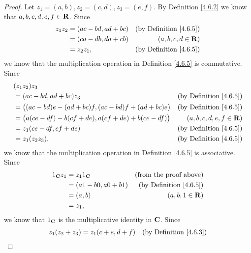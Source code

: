 \begin{proof}
    Let \(z_1 = (a, b), z_2 = (c, d), z_3 = (e, f)\).
    By Definition \ref{4.6.2} we know that \(a, b, c, d, e, f \in \mathbf{R}\).
    Since
    \begin{align*}
        z_1 z_2 & = (ac - bd, ad + bc) & \text{(by Definition \ref{4.6.5})} \\
                & = (ca - db, da + cb) & (a, b, c, d \in \mathbf{R})                \\
                & = z_2 z_1,           & \text{(by Definition \ref{4.6.5})}
    \end{align*}
    we know that the multiplication operation in Definition \ref{4.6.5} is commutative.
    Since
    \begin{align*}
         & (z_1 z_2) z_3                                                                                         \\
         & = (ac - bd, ad + bc) z_3                                         & \text{(by Definition \ref{4.6.5})} \\
         & = \big((ac - bd) e - (ad + bc) f, (ac - bd) f + (ad + bc) e\big) & \text{(by Definition \ref{4.6.5})} \\
         & = \big(a (ce - df) - b (cf + de), a (cf + de) + b (ce - df)\big) & (a, b, c, d, e, f \in \mathbf{R})          \\
         & = z_1 (ce - df, cf + de)                                         & \text{(by Definition \ref{4.6.5})} \\
         & = z_1 (z_2 z_3),                                                 & \text{(by Definition \ref{4.6.5})}
    \end{align*}
    we know that the multiplication operation in Definition \ref{4.6.5} is associative.
    Since
    \begin{align*}
        1_{\mathbf{C}} z_1 & = z_1 1_{\mathbf{C}}             & \text{(from the proof above)}      \\
                   & = (a 1 - b 0, a 0 + b 1) & \text{(by Definition \ref{4.6.5})} \\
                   & = (a, b)                 & (a, b, 1 \in \mathbf{R})                   \\
                   & = z_1,
    \end{align*}
    we know that \(1_{\mathbf{C}}\) is the multiplicative identity in \(\mathbf{C}\).
    Since
    \begin{align*}
        z_1 (z_2 + z_3) & = z_1 (c + e, d + f)                                      & \text{(by Definition \ref{4.6.3})} \\

\end{align*}
\end{proof}
